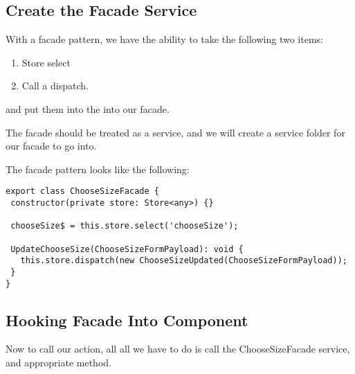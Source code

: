 \subsection{ Create the Facade Service  }

With a facade pattern, we have the ability to take the following two items:
\begin{enumerate}
  \item Store select
  \item Call a dispatch.
\end{enumerate}

and put them into the into our facade.

The facade should be treated as a service, and we will create a service folder
for our facade to go into.

The facade pattern looks like the following:
\begin{lstlisting}
export class ChooseSizeFacade {
 constructor(private store: Store<any>) {}

 chooseSize$ = this.store.select('chooseSize');

 UpdateChooseSize(ChooseSizeFormPayload): void {
   this.store.dispatch(new ChooseSizeUpdated(ChooseSizeFormPayload));
 }
}
\end{lstlisting}

\subsection{ Hooking Facade Into Component }
Now to call our action, all all we have to do is call the ChooseSizeFacade
service, and appropriate method.

